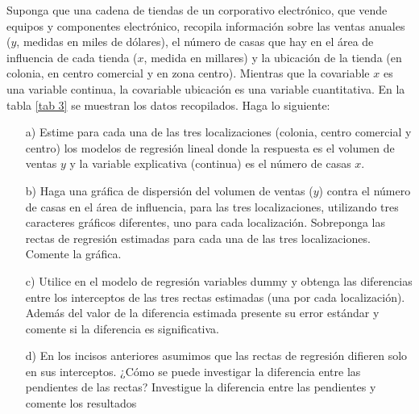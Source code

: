 \documentclass[10.5pt,notitlepage]{article}
\theoremstyle{plain}
\begin{document}
\begin{exo}
Suponga que una cadena de tiendas de un corporativo electrónico, que vende equipos y componentes electrónico, recopila información sobre las ventas anuales ($y$, medidas en miles de dólares), el número de casas que hay en el área de influencia de cada tienda ($x$, medida en millares) y la ubicación de la tienda (en colonia, en centro comercial y en zona centro). Mientras que la covariable $x$ es una variable continua, la covariable ubicación es una variable cuantitativa. En la tabla \ref{tab 3} se muestran los datos recopilados. Haga lo siguiente:
    \begin{itemize}
        \item[a)] Estime para cada una de las tres localizaciones (colonia, centro comercial y centro) los modelos de regresión lineal donde la respuesta es el volumen de ventas $y$ y la variable explicativa (continua) es el número de casas $x$.
        \item[b)] Haga una gráfica de dispersión del volumen de ventas ($y$) contra el número de casas en el área de influencia, para las tres localizaciones, utilizando tres caracteres gráficos diferentes, uno para cada localización. Sobreponga las rectas de regresión estimadas para cada una de las tres localizaciones. Comente la gráfica.
        \item[c)] Utilice en el modelo de regresión variables dummy y obtenga las diferencias entre los interceptos de las tres rectas estimadas (una por cada localización). Además del valor de la diferencia estimada presente su error estándar y comente si la diferencia es significativa.
        \item[d)] En los incisos anteriores asumimos que las rectas de regresión difieren solo en sus interceptos. ¿Cómo se puede investigar la diferencia entre las pendientes de las rectas? Investigue la diferencia entre las pendientes y comente los resultados
    \end{itemize}
\end{exo}
\end{document}
